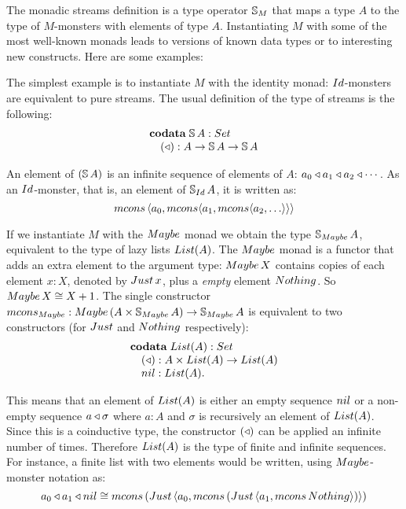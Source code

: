 The monadic streams definition is a type operator $\mathbb{S}_{M}$ that maps a type $A$ to the type of $M$-monsters with elements of type $A$.
Instantiating $M$ with some of the most well-known monads leads to versions of known data types or to interesting new constructs.
Here are some examples:

\begin{example}
The simplest example is to instantiate $M$ with the identity monad:
$\Id$-monsters are equivalent to pure streams.
The usual definition of the type of streams is the following:
$$
\begin{array}[t]{l}
\codata\;
\strsym\,A:\set\\
\quad (\scons): A\rightarrow \strsym\,A \rightarrow\strsym\,A
\end{array}
$$

An element of $(\mathbb{S}\,A)$ is an infinite sequence of elements of $A$: $a_0 \triangleleft a_1\triangleleft a_2\triangleleft \cdots$.
As an $\Id$-monster, that is, an element of $\stream{\Id}\,A$, it is written as:
$$
\mcons\,\langle a_0,\mcons \langle a_1, \mcons \langle a_2, \ldots \rangle \rangle \rangle
$$
\end{example}

\begin{example}
If we instantiate $M$ with the $\maybe$ monad we obtain the type $\stream{\maybe}\,A$, equivalent to the type of lazy lists $\lst{A}$.
The $\maybe$ monad is a functor that adds an extra element to the argument type:
$\maybe\,X$ contains copies of each element $x:X$, denoted by $\just\,x$, plus a {\em empty} element $\nothing$.
So $\maybe\,X \cong X+1$.
The single constructor $\mcons_\maybe: \maybe\,(A\times \stream{\maybe}\,A)\rightarrow\stream{\maybe}\,A$ is equivalent to two constructors (for $\just$ and $\nothing$ respectively):
$$
\begin{array}[t]{l}
\codata\;
\lst{A}:\set\\
\quad (\scons): A\times \lst{A}\rightarrow\lst{A}\\
\quad \nil: \lst{A}.
\end{array}
$$

This means that an element of $\lst{A}$ is either an empty sequence $\nil$ or a non-empty sequence $a\triangleleft \sigma$ where $a:A$ and $\sigma$ is recursively an element of $\lst{A}$.
Since this is a coinductive type, the constructor $(\triangleleft)$ can be applied an infinite number of times.
Therefore $\lst{A}$ is the type of finite and infinite sequences.
For instance, a finite list with two elements would be written, using $\maybe$-monster notation as:
$$
a_0 \scons a_1\scons \nil \cong
\mcons\, (\just\,\langle a_0, 
  \mcons\, (\just\,\langle a_1,
    \mcons\,\nothing\rangle) \rangle)
$$
\end{example}

